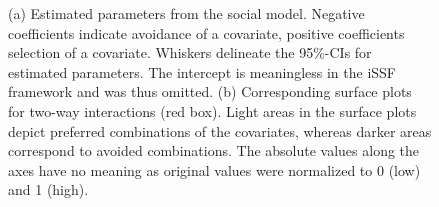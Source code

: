 \documentclass[abstract=on,10pt,a4paper,bibliography=totocnumbered]{scrartcl}
\begin{document}
\begin{figure}[hbtp]
  \begin{center}
    \caption{(a) Estimated parameters from the social model. Negative
    coefficients indicate avoidance of a covariate, positive coefficients
    selection of a covariate. Whiskers delineate the 95\%-CIs for estimated
    parameters. The intercept is meaningless in the iSSF framework and was thus
    omitted. (b) Corresponding surface plots for two-way interactions (red box).
    Light areas in the surface plots depict preferred combinations of the
    covariates, whereas darker areas correspond to avoided combinations. The
    absolute values along the axes have no meaning as original values were
    normalized to 0 (low) and 1 (high).}
    \label{SocialModel}
  \end{center}
\end{figure}
\end{document}

